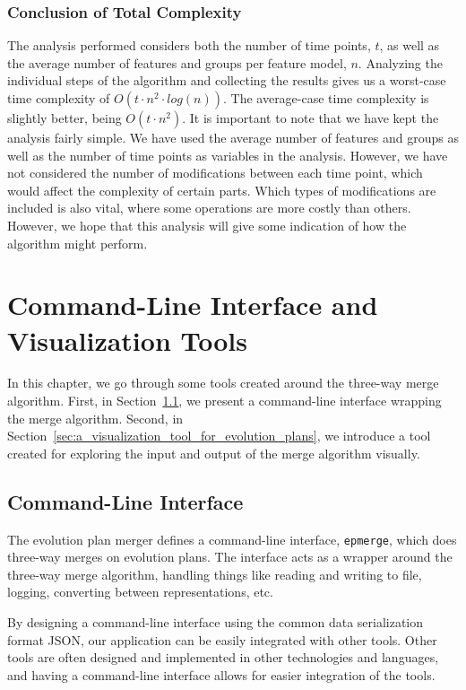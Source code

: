 \documentclass[a4paper,english]{ifimaster}
\begin{document}
\subsection*{Conclusion of Total Complexity}%
\label{sub:conclusion_of_total_complexity}

The analysis performed considers both the number of time points, $t$, as well as the average number of features and groups per feature model, $n$. Analyzing the individual steps of the algorithm and collecting the results gives us a worst-case time complexity of $O(t \cdot n^2 \cdot log(n))$. The average-case time complexity is slightly better, being $O(t \cdot n^2)$. It is important to note that we have kept the analysis fairly simple. We have used the average number of features and groups as well as the number of time points as variables in the analysis. However, we have not considered the number of modifications between each time point, which would affect the complexity of certain parts. Which types of modifications are included is also vital, where some operations are more costly than others. However, we hope that this analysis will give some indication of how the algorithm might perform.

\chapter{Command-Line Interface and Visualization Tools}%
\label{cha:command_line_interface_and_visualization_tools}

In this chapter, we go through some tools created around the three-way merge algorithm. First, in Section~\ref{sec:command_line_interface}, we present a command-line interface wrapping the merge algorithm. Second, in Section~\ref{sec:a_visualization_tool_for_evolution_plans}, we introduce a tool created for exploring the input and output of the merge algorithm visually.

\section{Command-Line Interface}%
\label{sec:command_line_interface}

The evolution plan merger defines a command-line interface, \texttt{epmerge}, which does three-way merges on evolution plans. The interface acts as a wrapper around the three-way merge algorithm, handling things like reading and writing to file, logging, converting between representations, etc. 

By designing a command-line interface using the common data serialization format JSON, our application can be easily integrated with other tools. Other tools are often designed and implemented in other technologies and languages, and having a command-line interface allows for easier integration of the tools.
\end{document}
